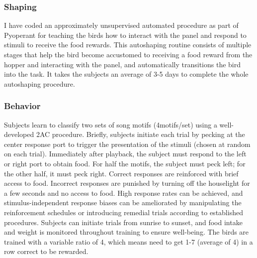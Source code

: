 \subsubsection{Shaping}
I have coded an approximately unsupervised automated procedure as part of Pyoperant for teaching the birds how to interact with the panel and respond to stimuli to receive the food rewards. This autoshaping routine\cite{brown1968auto} consists of multiple stages that help the bird become accustomed to receiving a food reward from the hopper and interacting with the panel, and automatically transitions the bird into the task. It takes the subjects an average of 3-5 days to complete the whole autoshaping procedure.

\subsubsection{Behavior}
Subjects learn to classify two sets of song motifs (4motifs/set) using a well-developed \ac{2AC} procedure\cite{gentner2003neuronal}. Briefly, subjects initiate each trial by pecking at the center response port to trigger the presentation of the stimuli (chosen at random on each trial). Immediately after playback, the subject must respond to the left or right port to obtain food. For half the motifs, the subject must peck left; for the other half, it must peck right. Correct responses are reinforced with brief access to food. Incorrect responses are punished by turning off the houselight for a few seconds and no access to food. High response rates can be achieved, and stimulus-independent response biases can be ameliorated by manipulating the reinforcement schedules or introducing remedial trials according to established procedures. Subjects can initiate trials from sunrise to sunset, and food intake and weight is monitored throughout training to ensure well-being. The birds are trained with a variable ratio of 4, which means need to get 1-7 (average of 4) in a row correct to be rewarded.

